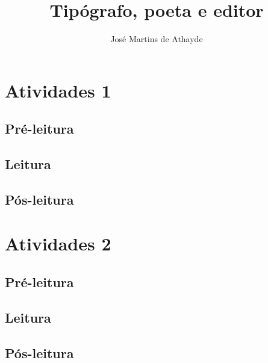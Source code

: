 \documentclass{extarticle}
\begin{document}
\newcommand{\AutorLivro}{José Martins de Athayde}
\newcommand{\TituloLivro}{Tipógrafo, poeta e editor}
\newcommand{\Tema}{Ficção, mistério e fantasia}
\newcommand{\Genero}{Poema}
\newcommand{\issnppub}{---}
\newcommand{\issnepub}{---}
\newcommand{\colaborador}{\textbf{Fulano de Tal} é uma pessoa incrível e vai fazer um bom serviço.}


\title{\TituloLivro}
\author{\AutorLivro}
\def\authornotes{\colaborador}

\date{}
\maketitle

\begin{abstract}
\lipsum[1-3]
\end{abstract}

\tableofcontents




\section{Atividades 1}


\subsection{Pré-leitura}
\subsection{Leitura}
\subsection{Pós-leitura}



\section{Atividades 2}

\subsection{Pré-leitura}
\subsection{Leitura}
\subsection{Pós-leitura}

\lipsum
\end{document}
